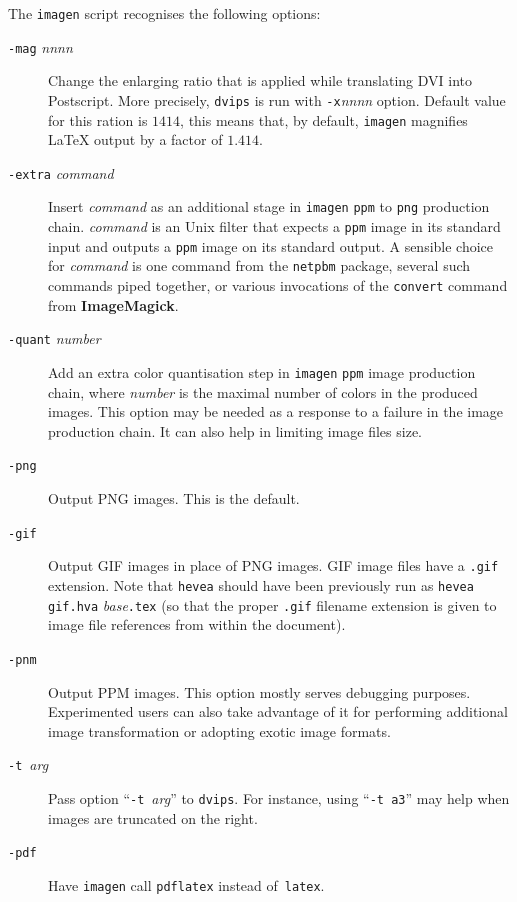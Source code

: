 The \texttt{imagen} script recognises the following options:
\begin{description}
\item[{\tt -mag} {\sl nnnn}] Change the enlarging ratio that is applied
while translating DVI into Postscript.
More precisely,  \texttt{dvips} is run with \texttt{-x}{\sl nnnn}
option.
Default value for this ration is $1414$, this means
that, by default, \texttt{imagen} magnifies \LaTeX{} output by a factor of
$1.414$.
\item[{\tt -extra} {\it command}] Insert {\it command} as an additional
stage in \texttt{imagen} \texttt{ppm} to \texttt{png} production chain.
\textit{command} is an Unix filter that expects a \texttt{ppm} image
in its standard input and outputs a \texttt{ppm} image on its standard output.
A sensible choice for \textit{command} is one command from the
\texttt{netpbm} package, several such commands piped together, or
various invocations of the \texttt{convert} command from \textbf{ImageMagick}.
\item[{\tt -quant} {\it number}] Add an extra color quantisation step
in \texttt{imagen} \texttt{ppm} image production chain, where
\textit{number} is the maximal number of colors in the produced
images. This option may be needed as a response to a failure in the
image production chain. It can also help in limiting image files size.
\item[{\tt -png}] Output PNG images. This is the default.
\item[{\tt -gif}]
Output GIF images in place of PNG images.
GIF image files have a \texttt{.gif} extension.
Note that \texttt{hevea} should have been previously run as
\texttt{hevea gif.hva} \textit{base}\texttt{.tex} (so that the proper
\texttt{.gif} filename
extension is given to image file references from within the \html{}
document).
\item[{\tt -pnm}] Output PPM images. This option mostly serves
debugging purposes. Experimented users can also take advantage
of it for performing additional image transformation or
adopting exotic image formats.
\item[{\tt -t}~{\it arg}] Pass option ``{\tt -t}~{\it arg}'' to
\texttt{dvips}.
For instance, using ``\texttt{-t a3}'' may help when images are
truncated on the right.
\item[{\tt -pdf}]
Have \texttt{imagen} call \texttt{pdflatex} instead
of~\texttt{latex}.
\end{description}

